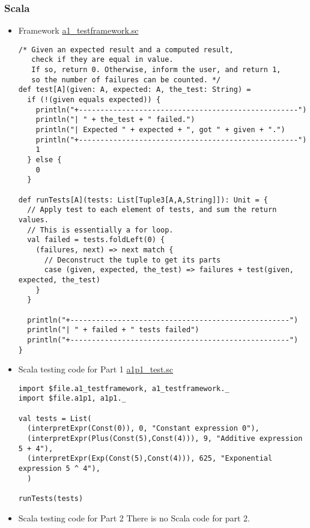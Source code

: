 \documentclass[11pt]{article}
\begin{document}
\subsubsection*{Scala}
\label{sec:orgf64f997}
\begin{itemize}
\item Framework
\label{sec:org3576356}
\href{./testing/a1/a1\_testframework.sc}{a1\_testframework.sc}
\begin{verbatim}
/* Given an expected result and a computed result,
   check if they are equal in value.
   If so, return 0. Otherwise, inform the user, and return 1,
   so the number of failures can be counted. */
def test[A](given: A, expected: A, the_test: String) =
  if (!(given equals expected)) {
    println("+---------------------------------------------------")
    println("| " + the_test + " failed.")
    println("| Expected " + expected + ", got " + given + ".")
    println("+---------------------------------------------------")
    1
  } else {
    0
  }

def runTests[A](tests: List[Tuple3[A,A,String]]): Unit = {
  // Apply test to each element of tests, and sum the return values.
  // This is essentially a for loop.
  val failed = tests.foldLeft(0) {
    (failures, next) => next match {
      // Deconstruct the tuple to get its parts
      case (given, expected, the_test) => failures + test(given, expected, the_test)
    }
  }
  
  println("+---------------------------------------------------")
  println("| " + failed + " tests failed")
  println("+---------------------------------------------------")
}
\end{verbatim}

\item Scala testing code for Part 1
\label{sec:org5f3e0b0}
\href{./testing/a1/a1p1\_test.sc}{a1p1\_test.sc}
\begin{verbatim}
import $file.a1_testframework, a1_testframework._
import $file.a1p1, a1p1._

val tests = List(
  (interpretExpr(Const(0)), 0, "Constant expression 0"),
  (interpretExpr(Plus(Const(5),Const(4))), 9, "Additive expression 5 + 4"),
  (interpretExpr(Exp(Const(5),Const(4))), 625, "Exponential expression 5 ^ 4"),
  )

runTests(tests)
\end{verbatim}

\item Scala testing code for Part 2
\label{sec:org2a83280}
There is no Scala code for part 2.


\end{itemize}
\end{document}
